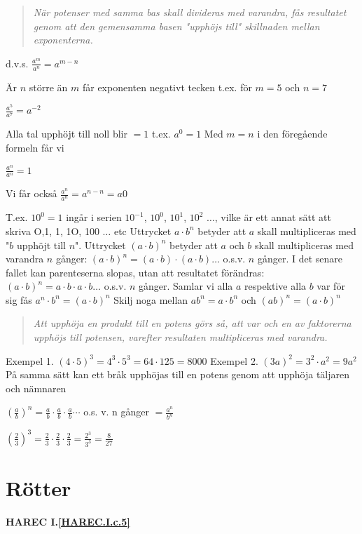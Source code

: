 \begin{quote}\emph{När potenser med samma bas skall divideras med varandra, fås
resultatet genom att den gemensamma basen "upphöjs till" skillnaden mellan
exponenterna.}\end{quote}

d.v.s. $\frac{a^m}{a^n} = a^{m-n}$

Är $n$ större än $m$ får exponenten negativt tecken t.ex. för $m = 5$ och $n = 7$

$\frac{a^5}{a^7} = a^{-2}$

Alla tal upphöjt till noll blir $= 1$ t.ex. $a^0 = 1$
Med $m = n$ i den föregående formeln får vi

$\frac{a^n}{a^n} = 1$

Vi får också $\frac{a^n}{a^n} = a^{n-n} =a0$

T.ex. $10^0 = 1$ ingår i serien $10^{-1}$, $10^0$, $10^1$, $10^2$ $\ldots$, vilke
är ett annat sätt att skriva O,1, 1, 1O, 100 $\ldots$ etc
Uttrycket $a \cdot b^n$ betyder att $a$ skall multipliceras med "$b$ upphöjt
till $n$".
Uttrycket $(a \cdot b)^n$ betyder att $a$ och $b$ skall multipliceras med
varandra $n$ gånger:
$(a \cdot b)^n = (a \cdot b) \cdot (a \cdot b) \ldots $ o.s.v. $n$ gånger.
I det senare fallet kan parenteserna slopas, utan att resultatet förändras:
$(a \cdot b)^n = a \cdot b \cdot a \cdot b \ldots$ o.s.v. $n$ gånger.
Samlar vi alla $a$ respektive alla $b$ var för sig fås $a^n \cdot b^n = (a \cdot b)^n$
Skilj noga mellan $ab^n = a \cdot b^n$
och $(ab)^n = (a \cdot b)^n$

\begin{quote}\emph{
Att upphöja en produkt till en potens görs så, att var och en av faktorerna
upphöjs till potensen, varefter resultaten multipliceras med varandra.
}\end{quote}

Exempel 1. $(4 \cdot 5)^3 = 4^3 \cdot 5^3 = 64 \cdot 125 = 8000$
Exempel 2. $(3a)^2 = 3^2 \cdot a^2 = 9a^2$
På samma sätt kan ett bråk upphöjas till en potens genom att upphöja täljaren
och nämnaren

$\left(\frac{a}{b}\right)^n = \frac{a}{b} \cdot \frac{a}{b} \cdot \frac{a}{b} \cdots$ o.s. v. n gånger $= \frac{a^n}{b^n}$

$\left(\frac{2}{3}\right)^3 = \frac{2}{3} \cdot \frac{2}{3} \cdot \frac{2}{3} =  \frac{2^3}{3^3} = \frac{8}{27}$

\section{Rötter}
\textbf{HAREC I.\ref{HAREC.I.c.5}\label{myHAREC.I.c.5}}

